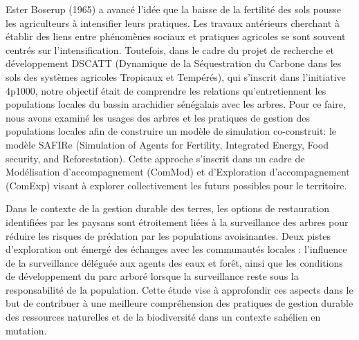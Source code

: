 \documentclass{article}
\begin{document}
Ester Boserup (1965) a avancé l'idée que la baisse de la fertilité des sols pousse les agriculteurs à intensifier leurs pratiques. Les travaux antérieurs cherchant à établir des liens entre phénomènes sociaux et pratiques agricoles se sont souvent centrés sur l'intensification. Toutefois, dans le cadre du projet de recherche et développement DSCATT (Dynamique de la Séquestration du Carbone dans les sols des systèmes agricoles Tropicaux et Tempérés), qui s'inscrit dans l'initiative 4p1000, notre objectif était de comprendre les relations qu'entretiennent les populations locales du bassin arachidier sénégalais avec les arbres. Pour ce faire, nous avons examiné les usages des arbres et les pratiques de gestion des populations locales afin de construire un modèle de simulation co-construit: le modèle SAFIRe (Simulation of Agents for Fertility, Integrated Energy, Food security, and Reforestation). Cette approche s'inscrit dans un cadre de Modélisation d'accompagnement (ComMod) \cite{etienne_companion_2014,barreteau_our_2003} et d'Exploration d'accompagnement (ComExp) \cite{delay_comexp_2020} visant à explorer collectivement les futurs possibles pour le territoire.

Dans le contexte de la gestion durable des terres, les options de restauration identifiées par les paysans sont étroitement liées à la surveillance des arbres pour réduire les risques de prédation par les populations avoisinantes. Deux pistes d'exploration ont émergé des échanges avec les communautés locales : l'influence de la surveillance déléguée aux agents des eaux et forêt, ainsi que les conditions de développement du parc arboré lorsque la surveillance reste sous la responsabilité de la population. Cette étude vise à approfondir ces aspects dans le but de contribuer à une meilleure compréhension des pratiques de gestion durable des ressources naturelles et de la biodiversité dans un contexte sahélien en mutation.


\end{document}
